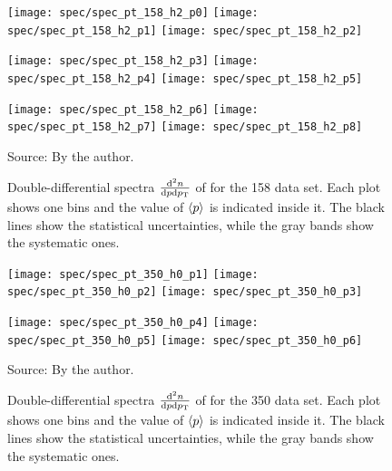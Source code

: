 \begin{figure}[!ht]
  \centering

  \texttt{[image: spec/spec\_pt\_158\_h2\_p0]}
  \texttt{[image: spec/spec\_pt\_158\_h2\_p1]}
  \texttt{[image: spec/spec\_pt\_158\_h2\_p2]}
  
  \texttt{[image: spec/spec\_pt\_158\_h2\_p3]}
  \texttt{[image: spec/spec\_pt\_158\_h2\_p4]}
  \texttt{[image: spec/spec\_pt\_158\_h2\_p5]}

  \texttt{[image: spec/spec\_pt\_158\_h2\_p6]}
  \texttt{[image: spec/spec\_pt\_158\_h2\_p7]}
  \texttt{[image: spec/spec\_pt\_158\_h2\_p8]}

  \caption{Double-differential spectra $\frac{\text{d}^2n}{\text{d}p\text{d}p_\text{T}}$
    of \kzeros for the 158 \GeVc data set. Each plot shows one \pp bins and the value
    of $\langle p\rangle$ is indicated inside it. The black lines show the statistical
    uncertainties, while the gray bands show the systematic ones.}
  \label{fig:hadron:spec:vzero:all158:h2}
  \begin{center}
    \small Source: By the author. 
  \end{center}
\end{figure}


\begin{figure}[!ht]
  \centering

  \texttt{[image: spec/spec\_pt\_350\_h0\_p1]}
  \texttt{[image: spec/spec\_pt\_350\_h0\_p2]}
  \texttt{[image: spec/spec\_pt\_350\_h0\_p3]}

  \texttt{[image: spec/spec\_pt\_350\_h0\_p4]}
  \texttt{[image: spec/spec\_pt\_350\_h0\_p5]}
  \texttt{[image: spec/spec\_pt\_350\_h0\_p6]}

  \caption{Double-differential spectra $\frac{\text{d}^2n}{\text{d}p\text{d}p_\text{T}}$
    of \lamb for the 350 \GeVc data set. Each plot shows one \pp bins and the value
    of $\langle p\rangle$ is indicated inside it. The black lines show the statistical
    uncertainties, while the gray bands show the systematic ones.}
  \label{fig:hadron:spec:vzero:all350:h0}
  \begin{center}
    \small Source: By the author. 
  \end{center}
\end{figure}


